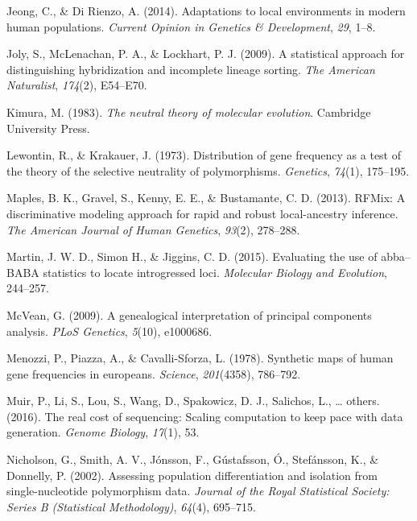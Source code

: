 \documentclass[12pt,twoside]{ugathesis}
\begin{document}
  \hypertarget{ref-jeong2014adaptations}{}
  Jeong, C., \& Di Rienzo, A. (2014). Adaptations to local environments in
  modern human populations. \emph{Current Opinion in Genetics \&
  Development}, \emph{29}, 1--8.
  
  \hypertarget{ref-joly2009statistical}{}
  Joly, S., McLenachan, P. A., \& Lockhart, P. J. (2009). A statistical
  approach for distinguishing hybridization and incomplete lineage
  sorting. \emph{The American Naturalist}, \emph{174}(2), E54--E70.
  
  \hypertarget{ref-kimura1983neutral}{}
  Kimura, M. (1983). \emph{The neutral theory of molecular evolution}.
  Cambridge University Press.
  
  \hypertarget{ref-lewontin1973distribution}{}
  Lewontin, R., \& Krakauer, J. (1973). Distribution of gene frequency as
  a test of the theory of the selective neutrality of polymorphisms.
  \emph{Genetics}, \emph{74}(1), 175--195.
  
  \hypertarget{ref-maples2013rfmix}{}
  Maples, B. K., Gravel, S., Kenny, E. E., \& Bustamante, C. D. (2013).
  RFMix: A discriminative modeling approach for rapid and robust
  local-ancestry inference. \emph{The American Journal of Human Genetics},
  \emph{93}(2), 278--288.
  
  \hypertarget{ref-martin2000}{}
  Martin, J. W. D., Simon H., \& Jiggins, C. D. (2015). Evaluating the use
  of abba--BABA statistics to locate introgressed loci. \emph{Molecular
  Biology and Evolution}, 244--257.
  
  \hypertarget{ref-mcvean2009genealogical}{}
  McVean, G. (2009). A genealogical interpretation of principal components
  analysis. \emph{PLoS Genetics}, \emph{5}(10), e1000686.
  
  \hypertarget{ref-menozzi1978synthetic}{}
  Menozzi, P., Piazza, A., \& Cavalli-Sforza, L. (1978). Synthetic maps of
  human gene frequencies in europeans. \emph{Science}, \emph{201}(4358),
  786--792.
  
  \hypertarget{ref-muir2016real}{}
  Muir, P., Li, S., Lou, S., Wang, D., Spakowicz, D. J., Salichos, L.,
  \ldots{} others. (2016). The real cost of sequencing: Scaling
  computation to keep pace with data generation. \emph{Genome Biology},
  \emph{17}(1), 53.
  
  \hypertarget{ref-nicholson2002assessing}{}
  Nicholson, G., Smith, A. V., Jónsson, F., Gústafsson, Ó., Stefánsson,
  K., \& Donnelly, P. (2002). Assessing population differentiation and
  isolation from single-nucleotide polymorphism data. \emph{Journal of the
  Royal Statistical Society: Series B (Statistical Methodology)},
  \emph{64}(4), 695--715.
  
\end{document}
